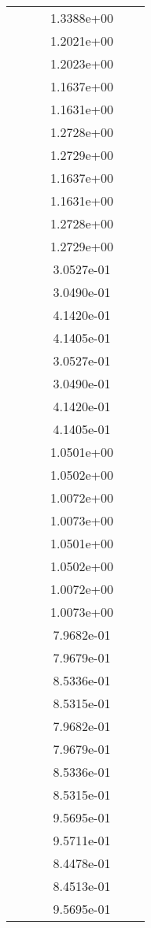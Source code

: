 \begin{xltabular}{\textwidth}{r|rS[table-format=1.3e+2]S[table-format=1.4e+2]S[table-format=1.4e+2]S[table-format=-1.5]}
&  &  & 1.3388e+00 & & \\
&  &  & 1.2021e+00 & & \\
&  &  & 1.2023e+00 & & \\
&  &  & 1.1637e+00 & & \\
&  &  & 1.1631e+00 & & \\
&  &  & 1.2728e+00 & & \\
&  &  & 1.2729e+00 & & \\
&  &  & 1.1637e+00 & & \\
&  &  & 1.1631e+00 & & \\
&  &  & 1.2728e+00 & & \\
&  &  & 1.2729e+00 & & \\
&  &  & 3.0527e-01 & & \\
&  &  & 3.0490e-01 & & \\
&  &  & 4.1420e-01 & & \\
&  &  & 4.1405e-01 & & \\
&  &  & 3.0527e-01 & & \\
&  &  & 3.0490e-01 & & \\
&  &  & 4.1420e-01 & & \\
&  &  & 4.1405e-01 & & \\
&  &  & 1.0501e+00 & & \\
&  &  & 1.0502e+00 & & \\
&  &  & 1.0072e+00 & & \\
&  &  & 1.0073e+00 & & \\
&  &  & 1.0501e+00 & & \\
&  &  & 1.0502e+00 & & \\
&  &  & 1.0072e+00 & & \\
&  &  & 1.0073e+00 & & \\
&  &  & 7.9682e-01 & & \\
&  &  & 7.9679e-01 & & \\
&  &  & 8.5336e-01 & & \\
&  &  & 8.5315e-01 & & \\
&  &  & 7.9682e-01 & & \\
&  &  & 7.9679e-01 & & \\
&  &  & 8.5336e-01 & & \\
&  &  & 8.5315e-01 & & \\
&  &  & 9.5695e-01 & & \\
&  &  & 9.5711e-01 & & \\
&  &  & 8.4478e-01 & & \\
&  &  & 8.4513e-01 & & \\
&  &  & 9.5695e-01 & & \\

\end{xltabular}
